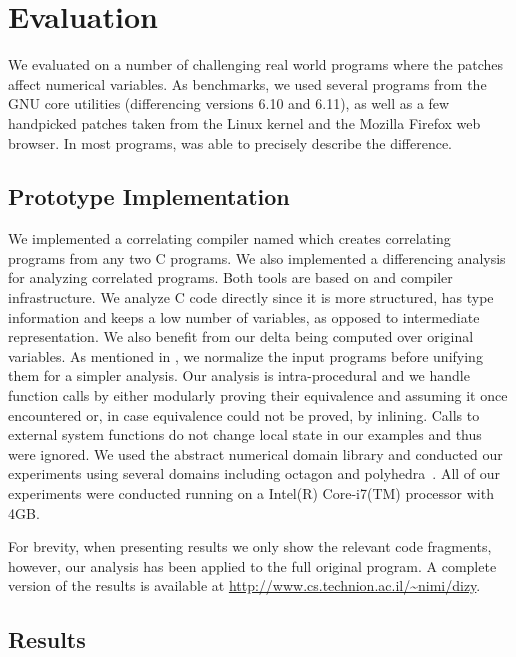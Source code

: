 \section{Evaluation}
We evaluated {\tool} on a number of challenging real world programs where the patches affect numerical variables. As benchmarks, we used several programs from the GNU core utilities (differencing versions 6.10 and 6.11), as well as a few handpicked patches taken from the Linux kernel and the Mozilla Firefox web browser. In most programs, {\tool} was able to precisely describe the difference.

\subsection{Prototype Implementation}
We implemented a correlating compiler named  which creates correlating programs from any two C programs. We also implemented a differencing analysis for analyzing correlated programs. Both tools are based on  and  compiler infrastructure. We analyze C code directly since it is more structured, has type information and keeps a low number of variables, as opposed to intermediate representation. We also benefit from our delta being computed over original variables. As mentioned in , we normalize the input programs before unifying them for a simpler analysis. Our analysis is intra-procedural and we handle function calls by either modularly proving their equivalence and assuming it once encountered or, in case equivalence could not be proved, by inlining. Calls to external system functions do not change local state in our examples and thus were ignored. We used the  abstract numerical domain library and conducted our experiments using several domains including octagon \cite{Mine2006} and polyhedra~\cite{CousotHalbwachs78}. All of our experiments were conducted running on a Intel(R) Core-i7(TM) processor with 4GB.

For brevity, when presenting results we only show the relevant code fragments, however, our analysis has been applied to the full original program. A complete version of the results is available at {\footnotesize \url{http://www.cs.technion.ac.il/~nimi/dizy}}.



\subsection{Results}

